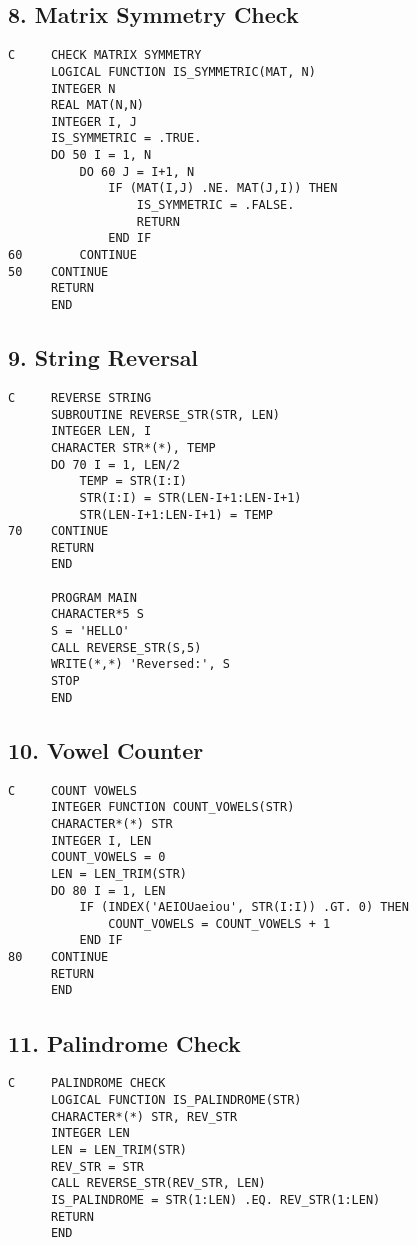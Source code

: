 \documentclass{book}
\begin{document}
\subsection*{8. Matrix Symmetry Check}
\begin{verbatim}
C     CHECK MATRIX SYMMETRY
      LOGICAL FUNCTION IS_SYMMETRIC(MAT, N)
      INTEGER N
      REAL MAT(N,N)
      INTEGER I, J
      IS_SYMMETRIC = .TRUE.
      DO 50 I = 1, N
          DO 60 J = I+1, N
              IF (MAT(I,J) .NE. MAT(J,I)) THEN
                  IS_SYMMETRIC = .FALSE.
                  RETURN
              END IF
60        CONTINUE
50    CONTINUE
      RETURN
      END
\end{verbatim}

\subsection*{9. String Reversal}
\begin{verbatim}
C     REVERSE STRING
      SUBROUTINE REVERSE_STR(STR, LEN)
      INTEGER LEN, I
      CHARACTER STR*(*), TEMP
      DO 70 I = 1, LEN/2
          TEMP = STR(I:I)
          STR(I:I) = STR(LEN-I+1:LEN-I+1)
          STR(LEN-I+1:LEN-I+1) = TEMP
70    CONTINUE
      RETURN
      END

      PROGRAM MAIN
      CHARACTER*5 S
      S = 'HELLO'
      CALL REVERSE_STR(S,5)
      WRITE(*,*) 'Reversed:', S
      STOP
      END
\end{verbatim}

\subsection*{10. Vowel Counter}
\begin{verbatim}
C     COUNT VOWELS
      INTEGER FUNCTION COUNT_VOWELS(STR)
      CHARACTER*(*) STR
      INTEGER I, LEN
      COUNT_VOWELS = 0
      LEN = LEN_TRIM(STR)
      DO 80 I = 1, LEN
          IF (INDEX('AEIOUaeiou', STR(I:I)) .GT. 0) THEN
              COUNT_VOWELS = COUNT_VOWELS + 1
          END IF
80    CONTINUE
      RETURN
      END
\end{verbatim}

\subsection*{11. Palindrome Check}
\begin{verbatim}
C     PALINDROME CHECK
      LOGICAL FUNCTION IS_PALINDROME(STR)
      CHARACTER*(*) STR, REV_STR
      INTEGER LEN
      LEN = LEN_TRIM(STR)
      REV_STR = STR
      CALL REVERSE_STR(REV_STR, LEN)
      IS_PALINDROME = STR(1:LEN) .EQ. REV_STR(1:LEN)
      RETURN
      END
\end{verbatim}
\end{document}
